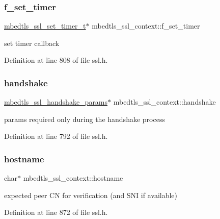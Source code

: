 \subsubsection{\texorpdfstring{f\+\_\+set\+\_\+timer}{f\_set\_timer}}
{\footnotesize\ttfamily \mbox{\hyperlink{ssl_8h_a61c5d9ed63c50ee809eec98820d3f36c}{mbedtls\+\_\+ssl\+\_\+set\+\_\+timer\+\_\+t}}$\ast$ mbedtls\+\_\+ssl\+\_\+context\+::f\+\_\+set\+\_\+timer}

set timer callback 

Definition at line 808 of file ssl.\+h.

\mbox{\label{structmbedtls__ssl__context_aca0569b7d5c02f79c47fdc964dcc7309}} 
\subsubsection{\texorpdfstring{handshake}{handshake}}
{\footnotesize\ttfamily \mbox{\hyperlink{structmbedtls__ssl__handshake__params}{mbedtls\+\_\+ssl\+\_\+handshake\+\_\+params}}$\ast$ mbedtls\+\_\+ssl\+\_\+context\+::handshake}

params required only during the handshake process 

Definition at line 792 of file ssl.\+h.

\mbox{\label{structmbedtls__ssl__context_a32d4187f88ff6a5153cfd85c6a752cb9}} 
\subsubsection{\texorpdfstring{hostname}{hostname}}
{\footnotesize\ttfamily char$\ast$ mbedtls\+\_\+ssl\+\_\+context\+::hostname}

expected peer CN for verification (and S\+NI if available) 

Definition at line 872 of file ssl.\+h.

\mbox{\label{structmbedtls__ssl__context_a81a9c513f47631c198d74cbeb4d1999f}} 
